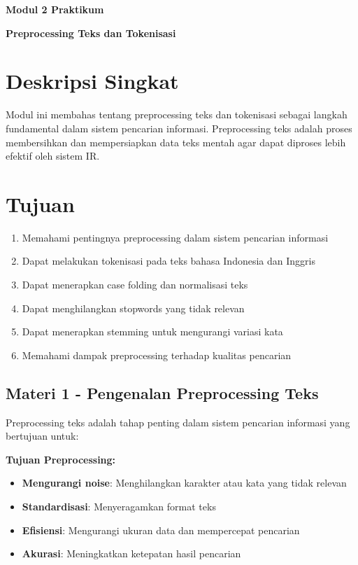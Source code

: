 \begin{center}
    \textbf{Modul 2 Praktikum \matakuliah}

    \textbf{Preprocessing Teks dan Tokenisasi}
\end{center}

\section*{Deskripsi Singkat}
Modul ini membahas tentang preprocessing teks dan tokenisasi sebagai langkah fundamental dalam sistem pencarian informasi. Preprocessing teks adalah proses membersihkan dan mempersiapkan data teks mentah agar dapat diproses lebih efektif oleh sistem IR.

\section*{Tujuan}
\begin{enumerate}
    \item Memahami pentingnya preprocessing dalam sistem pencarian informasi
    \item Dapat melakukan tokenisasi pada teks bahasa Indonesia dan Inggris
    \item Dapat menerapkan case folding dan normalisasi teks
    \item Dapat menghilangkan stopwords yang tidak relevan
    \item Dapat menerapkan stemming untuk mengurangi variasi kata
    \item Memahami dampak preprocessing terhadap kualitas pencarian
\end{enumerate}

\subsection*{Materi 1 - Pengenalan Preprocessing Teks}

Preprocessing teks adalah tahap penting dalam sistem pencarian informasi yang bertujuan untuk:

\textbf{Tujuan Preprocessing:}
\begin{itemize}
    \item \textbf{Mengurangi noise}: Menghilangkan karakter atau kata yang tidak relevan
    \item \textbf{Standardisasi}: Menyeragamkan format teks
    \item \textbf{Efisiensi}: Mengurangi ukuran data dan mempercepat pencarian
    \item \textbf{Akurasi}: Meningkatkan ketepatan hasil pencarian
\end{itemize}

